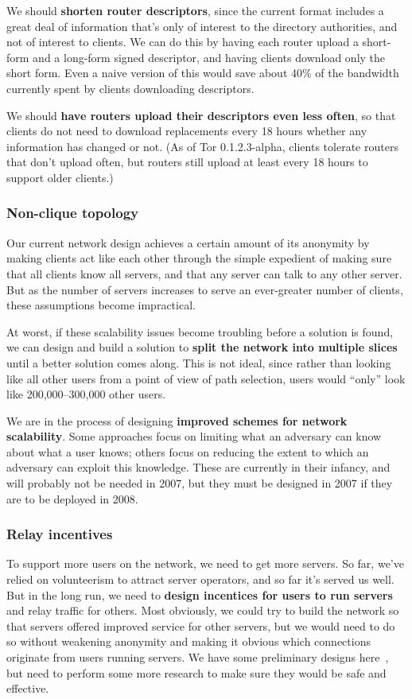 \documentclass{article}
\begin{document}
We should {\bf shorten router descriptors}, since the current format includes
a great deal of information that's only of interest to the directory
authorities, and not of interest to clients.  We can do this by having each
router upload a short-form and a long-form signed descriptor, and having
clients download only the short form.  Even a naive version of this would
save about 40\% of the bandwidth currently spent by clients downloading
descriptors.

We should {\bf have routers upload their descriptors even less often}, so
that clients do not need to download replacements every 18 hours whether any
information has changed or not.  (As of Tor 0.1.2.3-alpha, clients tolerate
routers that don't upload often, but routers still upload at least every 18
hours to support older clients.)

\subsubsection{Non-clique topology}
Our current network design achieves a certain amount of its anonymity by
making clients act like each other through the simple expedient of making
sure that all clients know all servers, and that any server can talk to any
other server.  But as the number of servers increases to serve an
ever-greater number of clients, these assumptions become impractical.

At worst, if these scalability issues become troubling before a solution is
found, we can design and build a solution to {\bf split the network into
multiple slices} until a better solution comes along.  This is not ideal,
since rather than looking like all other users from a point of view of path
selection, users would ``only'' look like 200,000--300,000 other users.

We are in the process of designing {\bf improved schemes for network
  scalability}.  Some approaches focus on limiting what an adversary can know
about what a user knows; others focus on reducing the extent to which an
adversary can exploit this knowledge.  These are currently in their infancy,
and will probably not be needed in 2007, but they must be designed in 2007 if
they are to be deployed in 2008.

\subsubsection{Relay incentives}
To support more users on the network, we need to get more servers.  So far,
we've relied on volunteerism to attract server operators, and so far it's
served us well.  But in the long run, we need to {\bf design incentices for
  users to run servers} and relay traffic for others.  Most obviously, we
could try to build the network so that servers offered improved service for
other servers, but we would need to do so without weakening anonymity and
making it obvious which connections originate from users running servers.  We
have some preliminary designs here~\cite{challenges}, but need to perform
some more research to make sure they would be safe and effective.
\end{document}
